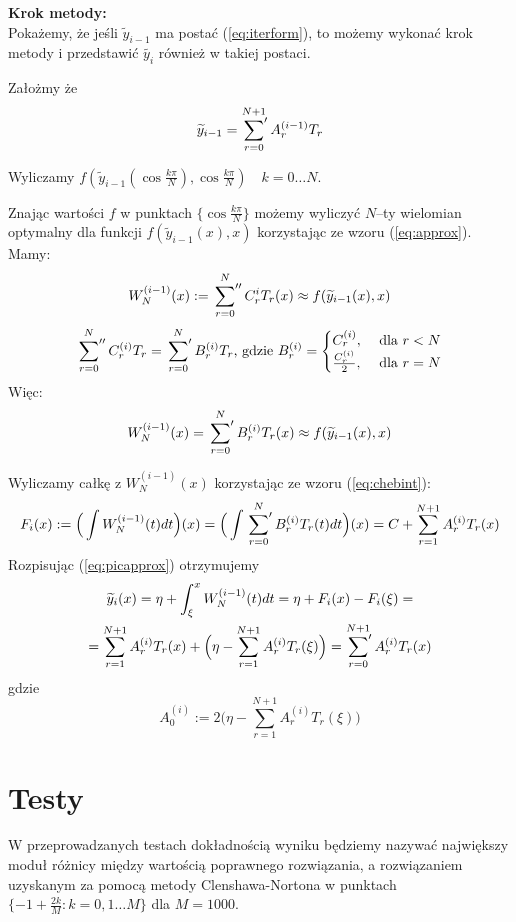 \documentclass{article}
\newcommand{\sumprim}[3] {
	\sideset{}{'}\sum_{#1}^{#2} #3
}
\newcommand{\sumbis}[3] {
	\sideset{}{''}\sum_{#1}^{#2} #3
}
\newcommand{\chebu}[1] {
	\cos{ \frac{ #1 \pi }{N} }
}
\begin{document}
\textbf{Krok metody:} \\
	Pokażemy, że jeśli $\widetilde{ y }_{i-1}$ ma postać (\ref{eq:iterform}), to możemy wykonać krok metody i przedstawić $\widetilde{ y_i }$ również w takiej postaci.
	\par Założmy że
		$$ \widetilde{ y }_{i-1} = \sumprim{r=0}{N+1}{ A_r^{(i-1)} T_r } $$
		
	\par Wyliczamy $f(\widetilde{y}_{i-1}(\chebu{k} ), \chebu{k}) \quad k=0 \ldots N $.
	\par Znając wartości $f$ w punktach $\{ \chebu{k} \}$ możemy wyliczyć $N$--ty wielomian optymalny dla funkcji $f(\widetilde{y}_{i-1}(x), x)$ korzystając ze wzoru (\ref{eq:approx}). \\
	Mamy: \\
	$$ W_N^{(i-1)}(x) := \sumbis{r=0}{N}{C_r^i T_r}(x) \approx f(\widetilde{y}_{i-1}(x), x) $$
	$$ \sumbis{r=0}{N}{C_r^{(i)} T_r} = \sumprim{r=0}{N}{B_r^{(i)} T_r} 
	 \text{,  gdzie } B_r^{(i)}= 
	 \begin{cases} 
	 	C_r^{(i)}, & \text{ dla $r < N$}\\
	 	\frac{C_r^{(i)}}{2}, & \text{ dla $r=N$}
	 \end{cases}$$
	Więc: \\
	$$ W_N^{(i-1)}(x) = \sumprim{r=0}{N}{B_r^{(i)} T_r}(x)  \approx f(\widetilde{y}_{i-1}(x), x) $$
	
	\par Wyliczamy całkę z $W_N^{(i-1)}(x)$ korzystając ze wzoru (\ref{eq:chebint}):
		$$ F_i(x) := \Big( \int  W_N^{(i-1)}(t) dt \Big) (x) =  \Big( \int \sumprim{r=0}{N}{B_r^{(i)} T_r(t)}dt \Big)(x)  = C + \sum_{r=1}^{N+1} A_r^{(i)} T_r(x) $$
	Rozpisując (\ref{eq:picapprox}) otrzymujemy 
		\begin{gather*}
		\widetilde{y}_i(x) = \eta + \int_{\xi}^x W_N^{(i-1)}(t) dt = \eta + F_i(x) - F_i(\xi) = \\ 
		= \sum_{r=1}^{N+1} A_r^{(i)} T_r(x)  + \Big( \eta - \sum_{r=1}^{N+1} A_r^{(i)} T_r(\xi) \Big) = \sumprim{r=0}{N+1}{A_r^{(i)} T_r(x)} 
		\end{gather*}
		gdzie
		$$ A_0^{(i)} := 2 \Big( \eta - \sum_{r=1}^{N+1} A_r^{(i)} T_r(\xi) \Big) $$
	
\section{Testy}

\par W przeprowadzanych testach dokładnością wyniku będziemy nazywać największy moduł różnicy między wartością poprawnego rozwiązania, a rozwiązaniem uzyskanym za pomocą metody Clenshawa-Nortona w punktach 
$ \{ -1 + \frac{2k}{M} : k = 0,1 \ldots M \} $ dla $M = 1000$.
 
\end{document}

